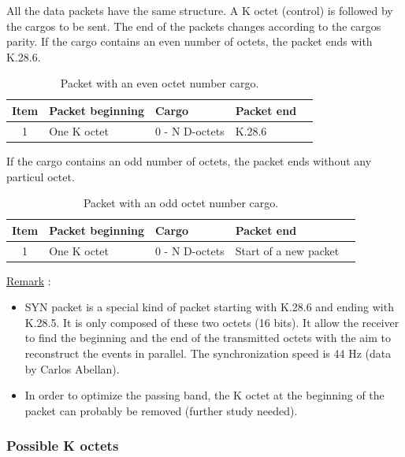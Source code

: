 All the data packets have the same structure. A K octet (control) is followed by the cargos to be sent. The end of the packets changes according to the cargos parity.\newline
If the cargo contains an even number of octets, the packet ends with K.28.6.
\begin{table} [!htbp]
  \centering
  \caption{Packet with an even octet number cargo.}
\begin{tabular}{|c|p{4cm}|p{4cm}|p{4cm}|p{4cm}|}
\hline
\bf{Item}  & 		\bf{Packet beginning}		& \bf{Cargo}	& \bf{Packet end}\\
\hline
1			&	One K octet 	& 0 - N D-octets			&		K.28.6	\\
\hline
\end{tabular}
\end{table}

If the cargo contains an odd number of octets, the packet ends without any particul octet.

\begin{table} [!htbp]
  \centering
  \caption{Packet with an odd octet number cargo.}
\begin{tabular}{|c|p{4cm}|p{4cm}|p{4cm}|p{4cm}|}
\hline
\bf{Item}  & 		\bf{Packet beginning}		& \bf{Cargo}	& \bf{Packet end}\\
\hline
1			&	One K octet	&	0 - N D-octets				&	Start of a new packet	\\
\hline
\end{tabular}
\end{table}

\underline{Remark} :
	\begin{itemize}
		\item SYN packet is a special kind of packet starting with K.28.6 and ending with K.28.5. It is only composed of these two octets (16 bits). It allow the receiver to find the beginning and the end of the transmitted octets with the aim to reconstruct the events in parallel. The synchronization speed is 44 Hz (data by Carlos Abellan).
		\item In order to optimize the passing band, the K octet at the beginning of the packet can probably be removed (further study needed).
		\end{itemize}

\newpage


\subsubsection{Possible K octets\newline}

